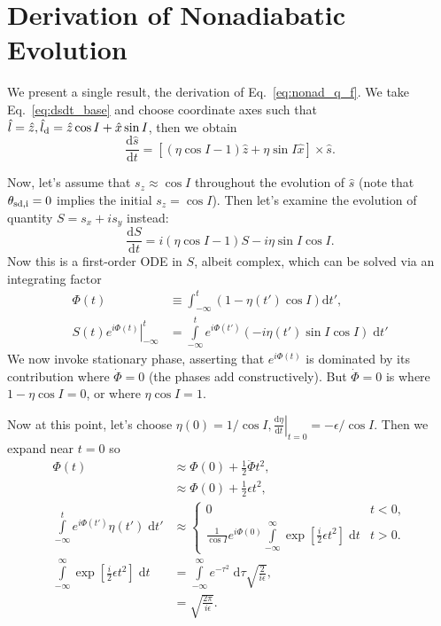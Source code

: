 \documentclass[
        fleqn,
        usenatbib,
        referee,
    ]{mnras}
\newcommand*{\rd}[2]{\frac{\mathrm{d}#1}{\mathrm{d}#2}}
\newcommand*{\at}[1]{\left.#1\right|}
\newcommand*{\p}[1]{\left(#1\right)}
\newcommand*{\s}[1]{\left[#1\right]}
\begin{document}
\section{Derivation of Nonadiabatic Evolution}\label{s:nonad_app}

We present a single result, the derivation of Eq.~\eqref{eq:nonad_q_f}. We take
Eq.~\eqref{eq:dsdt_base} and choose coordinate axes such that $\hat{l} = \hat{z},
\hat{l}_{\rm d} = \hat{z} \cos I + \hat{x}\sin I$, then we obtain
\begin{equation}
    \rd{\hat{s}}{t} = \s{
        \p{\eta \cos I - 1}\hat{z} + \eta \sin I \hat{x}} \times \hat{s}.
\end{equation}

Now, let's assume that $s_z \approx \cos I$ throughout the evolution of
$\hat{s}$ (note that $\theta_{\rm sd, i} = 0$ implies the initial $s_z = \cos
I$). Then let's examine the evolution of quantity $S = s_x + is_y$ instead:
\begin{equation}
    \rd{S}{t} = i\p{\eta\cos I - 1}S - i \eta \sin I\cos I.\label{eq:nonad_ode}
\end{equation}
Now this is a first-order ODE in $S$, albeit complex, which can be solved via
an integrating factor
\begin{align}
    \Phi(t) &\equiv \int_{-\infty}^t \p{1 - \eta(t') \cos I}
        \mathrm{d}t',\\
    \at{S(t) e^{i\Phi(t)}}_{-\infty}^t
        &= \int\limits_{-\infty}^t e^{i\Phi(t')}
            \p{-i\eta(t')\sin I\cos I}\;\mathrm{d}t'\label{eq:nonad_int}
\end{align}
We now invoke stationary phase, asserting that $e^{i\Phi(t)}$ is dominated by
its contribution where $\dot{\Phi} = 0$ (the phases add constructively). But
$\dot{\Phi} = 0$ is where $1 - \eta\cos I = 0$, or where $\eta\cos I = 1$.

Now at this point, let's choose $\eta(0) = 1/\cos I, \at{\rd{\eta}{t}}_{t=0} =
-\epsilon/\cos I$. Then we expand near $t = 0$ so
\begin{align}
    \Phi(t) &\approx \Phi(0) + \frac{1}{2}\ddot{\Phi}t^2,\\
        &\approx \Phi(0) + \frac{1}{2}\epsilon t^2,\\
    \int\limits_{-\infty}^t e^{i\Phi(t')}\eta(t')\;\mathrm{d}t'
        &\approx
        \begin{cases}
            0 & t < 0,\\
            \frac{1}{\cos I}e^{i\Phi(0)}\int\limits_{-\infty}^\infty
                \exp\s{\frac{i}{2}\epsilon t^2}\;\mathrm{d}t
                & t > 0.
        \end{cases}\\
    \int\limits_{-\infty}^\infty
                \exp\s{\frac{i}{2}\epsilon t^2}\;\mathrm{d}t
        &= \int\limits_{-\infty}^\infty e^{-\tau^2}\;\mathrm{d}\tau
            \sqrt{\frac{2}{i\epsilon}},\\
        &= \sqrt{\frac{2\pi}{i\epsilon}}.
\end{align}
\end{document}

